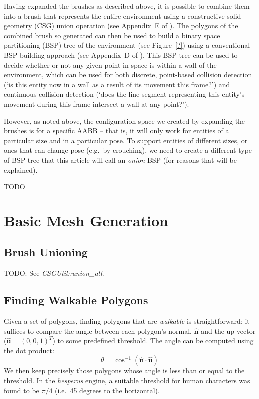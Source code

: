 \documentclass[10pt,twocolumn]{article}
\begin{document}
Having expanded the brushes as described above, it is possible to combine them into a brush that represents the entire environment using a constructive solid geometry (CSG) union operation (see Appendix~E of \cite{golodetz06}). The polygons of the combined brush so generated can then be used to build a binary space partitioning (BSP) tree of the environment (see Figure~\ref{?}) using a conventional BSP-building approach (see Appendix~D of \cite{golodetz06}). This BSP tree can be used to decide whether or not any given point in space is within a wall of the environment, which can be used for both discrete, point-based collision detection (`is this entity now in a wall as a result of its movement this frame?') and continuous collision detection (`does the line segment representing this entity's movement during this frame intersect a wall at any point?').

However, as noted above, the configuration space we created by expanding the brushes is for a specific AABB -- that is, it will only work for entities of a particular size and in a particular pose. To support entities of different sizes, or ones that can change pose (e.g.~by crouching), we need to create a different type of BSP tree that this article will call an \emph{onion} BSP (for reasons that will be explained).

TODO

\fi

\section{Basic Mesh Generation}
\label{sec:meshgen}

\subsection{Brush Unioning}

TODO: See \emph{CSGUtil::union\_all}.

\subsection{Finding Walkable Polygons}

Given a set of polygons, finding polygons that are \emph{walkable} is straightforward: it suffices to compare the angle between each polygon's normal, $\mathbf{\hat{n}}$ and the up vector ($\mathbf{\hat{u}} = (0,0,1)^T$) to some predefined threshold. The angle can be computed using the dot product:
%
\[
\theta = \cos^{-1} \left( \mathbf{\hat{n}} \cdot \mathbf{\hat{u}} \right)
\]
%
We then keep precisely those polygons whose angle is less than or equal to the threshold. In the \emph{hesperus} engine, a suitable threshold for human characters was found to be $\pi/4$ (i.e.~45 degrees to the horizontal).
\end{document}
